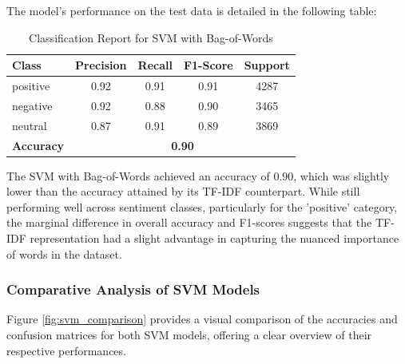 The model's performance on the test data is detailed in the following table:

\begin{table}[H]
\centering
\caption{Classification Report for SVM with Bag-of-Words}
\begin{tabular}{|l|c|c|c|c|}
\hline
\textbf{Class} & \textbf{Precision} & \textbf{Recall} & \textbf{F1-Score} & \textbf{Support} \\
\hline
positive & 0.92 & 0.91 & 0.91 & 4287 \\
negative & 0.92 & 0.88 & 0.90 & 3465 \\
neutral  & 0.87 & 0.91 & 0.89 & 3869 \\
\hline
\textbf{Accuracy} & \multicolumn{4}{|c|}{\textbf{0.90}} \\
\hline
\end{tabular}
\label{tab:svm_bow_report}
\end{table}


The SVM with Bag-of-Words achieved an accuracy of 0.90, which was slightly lower than the accuracy attained by its TF-IDF counterpart. While still performing well across sentiment classes, particularly for the 'positive' category, the marginal difference in overall accuracy and F1-scores suggests that the TF-IDF representation had a slight advantage in capturing the nuanced importance of words in the dataset.

\subsubsection{\textbf{Comparative Analysis of SVM Models}}

Figure \ref{fig:svm_comparison} provides a visual comparison of the accuracies and confusion matrices for both SVM models, offering a clear overview of their respective performances.

